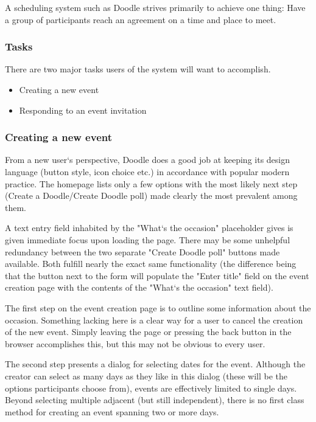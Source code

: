 \documentclass{sigchi}
\begin{document}
A scheduling system such as Doodle strives primarily to achieve one
thing: Have a group of participants reach an agreement on a time and
place to meet.

\subsubsection{Tasks}

There are two major tasks users of the system will want
to accomplish.

\begin{itemize}
\item Creating a new event
\item Responding to an event invitation
\end{itemize}

\subsubsection{Creating a new event}

From a new user`s perspective, Doodle does a good job at keeping its
design language (button style, icon choice etc.) in accordance with
popular modern practice. The homepage lists only a few options with
the most likely next step (Create a Doodle/Create Doodle poll) made
clearly the most prevalent among them.

A text entry field inhabited by the "What`s the occasion"
placeholder gives is given immediate focus upon loading the
page. There may be some unhelpful redundancy between the two
separate "Create Doodle poll" buttons made available. Both fulfill
nearly the exact same functionality (the difference being that the
button next to the form will populate the "Enter title" field on the
event creation page with the contents of the "What`s the occasion"
text field).

The first step on the event creation page is to outline some
information about the occasion. Something lacking here is a clear
way for a user to cancel the creation of the new event. Simply
leaving the page or pressing the back button in the browser
accomplishes this, but this may not be obvious to every user.

The second step presents a dialog for selecting dates for the
event. Although the creator can select as many days as they like in
this dialog (these will be the options participants choose from),
events are effectively limited to single days. Beyond selecting
multiple adjacent (but still independent), there is no first class
method for creating an event spanning two or more days. 
\end{document}
